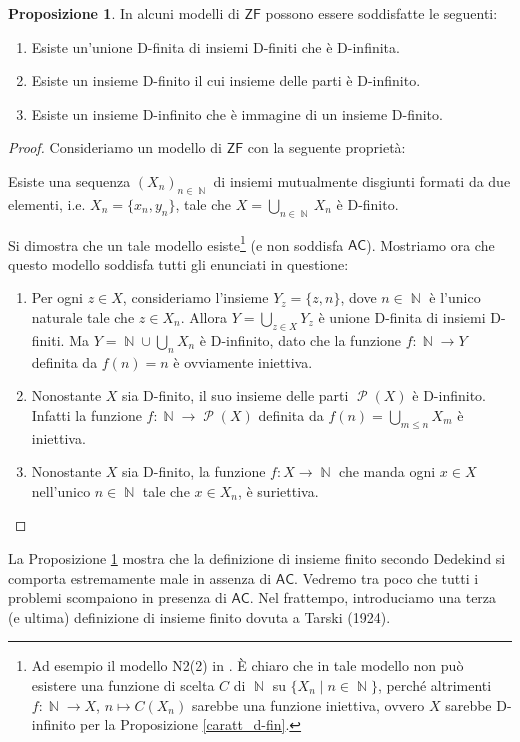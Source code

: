 \documentclass[12pt,a4paper]{report}
\theoremstyle{definition}
\newtheorem{prop}[teo]{Proposizione}  %
\theoremstyle{num.custom-title}
\DeclareMathOperator{\PP}{\mathcal{P}}
\DeclareMathOperator{\N}{\mathbb{N}}
\newcommand{\AC}{\ensuremath{\mathsf{AC}}\xspace}
\newcommand{\ZF}{\ensuremath{\mathsf{ZF}}\xspace}
\begin{document}
\begin{prop}\label{d-fin_bugs}
In alcuni modelli di \ZF possono essere soddisfatte le seguenti:
\begin{enumerate}
\item Esiste un'unione D-finita di insiemi D-finiti che è D-infinita.
\item Esiste un insieme D-finito il cui insieme delle parti è D-infinito.
\item Esiste un insieme D-infinito che è immagine di un insieme D-finito.
\end{enumerate}
\begin{proof}
Consideriamo un modello di \ZF con la seguente proprietà:
\begin{center}
Esiste una sequenza $(X_n)_{n \in \N}$ di insiemi mutualmente disgiunti formati da due elementi, i.e. $X_n=\{x_n,y_n\}$, tale che $X=\bigcup_{n \in \N} X_n$ è D-finito.
\end{center}
Si dimostra che un tale modello esiste\footnote{Ad esempio il modello N2(2) in \cite{HoRu98:Herrlich}. È chiaro che in tale modello non può esistere una funzione di scelta $C$ di $\N$ su $\{X_n \mid n \in \N\}$, perché altrimenti $f: \N \to X$, $n \mapsto C(X_n)$ sarebbe una funzione iniettiva, ovvero $X$ sarebbe D-infinito per la Proposizione \ref{caratt_d-fin}.} (e non soddisfa \AC). Mostriamo ora che questo modello soddisfa tutti gli enunciati in questione:
\begin{enumerate}
\item Per ogni $z \in X$, consideriamo l'insieme $Y_z = \{z,n\}$, dove $n \in \N$ è l'unico naturale tale che $z \in X_n$. Allora $Y= \bigcup_{z \in X} Y_z$ è unione D-finita di insiemi D-finiti. Ma $Y = \N \cup \bigcup_n X_n$ è D-infinito, dato che la funzione $f: \N \to Y$ definita da $f(n)=n$ è ovviamente iniettiva.
\item Nonostante $X$ sia D-finito, il suo insieme delle parti $\PP(X)$ è D-infinito. Infatti la funzione $f: \N \to \PP(X)$ definita da $f(n) = \displaystyle\bigcup_{m \leq n} X_m$ è iniettiva.
\item Nonostante $X$ sia D-finito, la funzione $f: X \to \N$ che manda ogni $x \in X$ nell'unico $n \in \N$ tale che $x \in X_n$, è suriettiva.
\end{enumerate}
\end{proof}
\end{prop}

La Proposizione \ref{d-fin_bugs} mostra che la definizione di insieme finito secondo Dedekind si comporta estremamente male in assenza di \AC. Vedremo tra poco che tutti i problemi scompaiono in presenza di \AC. Nel frattempo, introduciamo una terza (e ultima) definizione di insieme finito dovuta a Tarski (1924).
\end{document}
